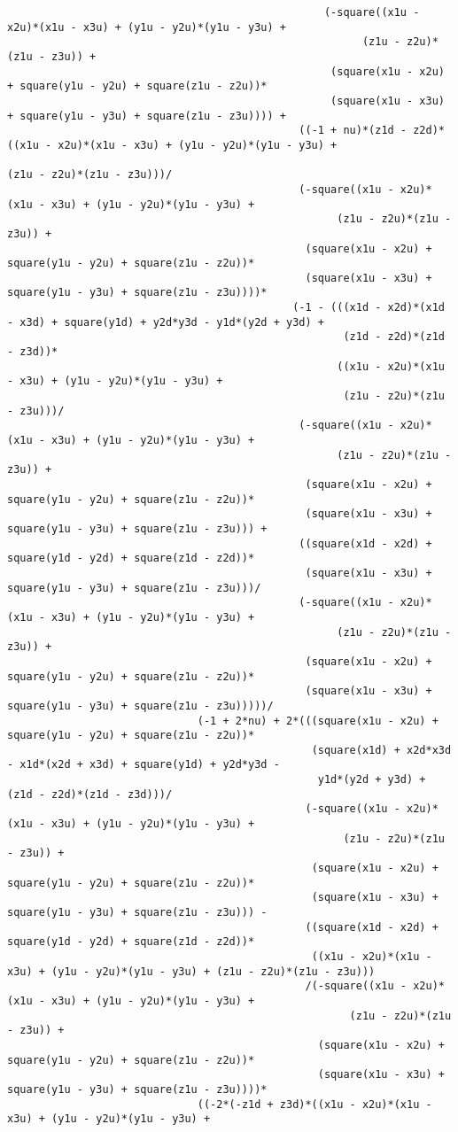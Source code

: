 \begin{lstlisting}
												  (-square((x1u - x2u)*(x1u - x3u) + (y1u - y2u)*(y1u - y3u) + 
														(z1u - z2u)*(z1u - z3u)) + 
												   (square(x1u - x2u) + square(y1u - y2u) + square(z1u - z2u))*
												   (square(x1u - x3u) + square(y1u - y3u) + square(z1u - z3u)))) + 
											  ((-1 + nu)*(z1d - z2d)*((x1u - x2u)*(x1u - x3u) + (y1u - y2u)*(y1u - y3u) + 
																	  (z1u - z2u)*(z1u - z3u)))/
											  (-square((x1u - x2u)*(x1u - x3u) + (y1u - y2u)*(y1u - y3u) + 
													(z1u - z2u)*(z1u - z3u)) + 
											   (square(x1u - x2u) + square(y1u - y2u) + square(z1u - z2u))*
											   (square(x1u - x3u) + square(y1u - y3u) + square(z1u - z3u))))*
											 (-1 - (((x1d - x2d)*(x1d - x3d) + square(y1d) + y2d*y3d - y1d*(y2d + y3d) + 
													 (z1d - z2d)*(z1d - z3d))*
													((x1u - x2u)*(x1u - x3u) + (y1u - y2u)*(y1u - y3u) + 
													 (z1u - z2u)*(z1u - z3u)))/
											  (-square((x1u - x2u)*(x1u - x3u) + (y1u - y2u)*(y1u - y3u) + 
													(z1u - z2u)*(z1u - z3u)) + 
											   (square(x1u - x2u) + square(y1u - y2u) + square(z1u - z2u))*
											   (square(x1u - x3u) + square(y1u - y3u) + square(z1u - z3u))) + 
											  ((square(x1d - x2d) + square(y1d - y2d) + square(z1d - z2d))*
											   (square(x1u - x3u) + square(y1u - y3u) + square(z1u - z3u)))/
											  (-square((x1u - x2u)*(x1u - x3u) + (y1u - y2u)*(y1u - y3u) + 
													(z1u - z2u)*(z1u - z3u)) + 
											   (square(x1u - x2u) + square(y1u - y2u) + square(z1u - z2u))*
											   (square(x1u - x3u) + square(y1u - y3u) + square(z1u - z3u)))))/
							  (-1 + 2*nu) + 2*(((square(x1u - x2u) + square(y1u - y2u) + square(z1u - z2u))*
												(square(x1d) + x2d*x3d - x1d*(x2d + x3d) + square(y1d) + y2d*y3d - 
												 y1d*(y2d + y3d) + (z1d - z2d)*(z1d - z3d)))/
											   (-square((x1u - x2u)*(x1u - x3u) + (y1u - y2u)*(y1u - y3u) + 
													 (z1u - z2u)*(z1u - z3u)) + 
												(square(x1u - x2u) + square(y1u - y2u) + square(z1u - z2u))*
												(square(x1u - x3u) + square(y1u - y3u) + square(z1u - z3u))) - 
											   ((square(x1d - x2d) + square(y1d - y2d) + square(z1d - z2d))*
												((x1u - x2u)*(x1u - x3u) + (y1u - y2u)*(y1u - y3u) + (z1u - z2u)*(z1u - z3u)))
											   /(-square((x1u - x2u)*(x1u - x3u) + (y1u - y2u)*(y1u - y3u) + 
													  (z1u - z2u)*(z1u - z3u)) + 
												 (square(x1u - x2u) + square(y1u - y2u) + square(z1u - z2u))*
												 (square(x1u - x3u) + square(y1u - y3u) + square(z1u - z3u))))*
							  ((-2*(-z1d + z3d)*((x1u - x2u)*(x1u - x3u) + (y1u - y2u)*(y1u - y3u) + 

\end{lstlisting}
